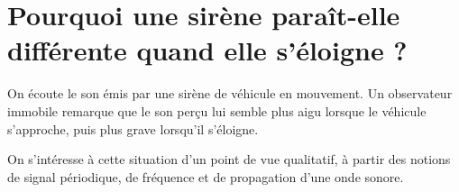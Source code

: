 \documentclass[11pt,a4paper]{article}
\begin{document}
\section{Pourquoi une sirène paraît-elle différente quand elle s’éloigne ?}

On écoute le son émis par une sirène de véhicule en mouvement.  
Un observateur immobile remarque que le son perçu lui semble plus aigu lorsque le véhicule s’approche, puis plus grave lorsqu’il s’éloigne.

On s’intéresse à cette situation d’un point de vue qualitatif, à partir des notions de signal périodique, de fréquence et de propagation d’une onde sonore.
\end{document}
